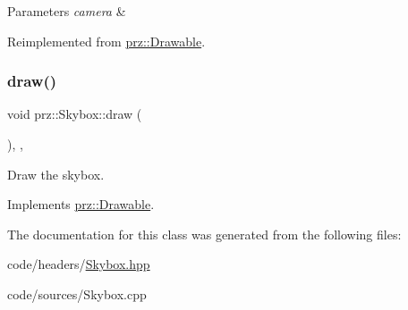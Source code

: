 \begin{DoxyParams}{Parameters}
{\em camera} & \\
\hline
\end{DoxyParams}


Reimplemented from \mbox{\hyperlink{classprz_1_1_drawable_ab82bbd8a27416a49efcef7fa11b59b89}{prz\+::\+Drawable}}.

\mbox{\label{classprz_1_1_skybox_aec1e6ca523b459acf02df4800e27de23}} 
\subsubsection{\texorpdfstring{draw()}{draw()}\hspace{0.1cm}{\footnotesize\ttfamily [2/2]}}
{\footnotesize\ttfamily void prz\+::\+Skybox\+::draw (\begin{DoxyParamCaption}{ }\end{DoxyParamCaption})\hspace{0.3cm}{\ttfamily [inline]}, {\ttfamily [override]}, {\ttfamily [virtual]}}



Draw the skybox. 



Implements \mbox{\hyperlink{classprz_1_1_drawable_aa6ca0ce45d4a00b69ecf47d5deb23825}{prz\+::\+Drawable}}.



The documentation for this class was generated from the following files\+:\begin{DoxyCompactItemize}
\item 
code/headers/\mbox{\hyperlink{_skybox_8hpp}{Skybox.\+hpp}}\item 
code/sources/Skybox.\+cpp\end{DoxyCompactItemize}
